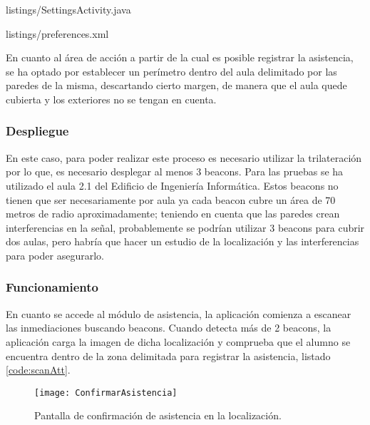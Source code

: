
{listings/SettingsActivity.java} %

\vspace{5mm}

{listings/preferences.xml} %
\vspace{5mm}

En cuanto al área de acción a partir de la cual es posible registrar la asistencia, se ha optado por establecer un perímetro dentro del aula delimitado por las paredes de la misma, descartando cierto margen, de manera que el aula quede cubierta y los exteriores no se tengan en cuenta. 

\subsubsection{Despliegue}

En este caso, para poder realizar este proceso es necesario utilizar la trilateración \cite{URL::trilateracion} por lo que, es necesario desplegar al menos 3 beacons. Para las pruebas se ha utilizado el aula 2.1 del Edificio de Ingeniería Informática. Estos beacons no tienen que ser necesariamente por aula ya cada beacon cubre un área de 70 metros de radio aproximadamente; teniendo en cuenta que las paredes crean interferencias en la señal, probablemente se podrían utilizar 3 beacons para cubrir dos aulas, pero habría que hacer un estudio de la localización y las interferencias para poder asegurarlo. 

\subsubsection{Funcionamiento}


En cuanto se accede al módulo de asistencia, la aplicación comienza a escanear las inmediaciones buscando beacons. Cuando detecta más de 2 beacons, la aplicación carga la imagen de dicha localización y comprueba que el alumno se encuentra dentro de la zona delimitada para registrar la asistencia, listado \ref{code:scanAtt}.

\begin{figure}[H]
	\centering
	\texttt{[image: ConfirmarAsistencia]}
	\caption{Pantalla de confirmación de asistencia en la localización.}
	\label{fig:confirmarAsistencia}
\end{figure}

